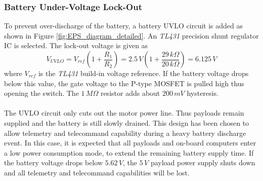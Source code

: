 \subsubsection{Battery Under-Voltage Lock-Out}
To prevent over-discharge of the battery, a battery \ac{UVLO} circuit is added as shown in Figure \ref{fig:EPS_diagram_detailed}. An \textit{TL431} precision shunt regulator \ac{IC} is selected. The lock-out voltage is given as
%
\begin{equation}
V_{UVLO}=V_{ref}(1+\dfrac{R_1}{R_2})=2.5\,V(1+\dfrac{29\,k \Omega}{20\,k \Omega})=6.125\,V
\end{equation}
%
where $V_{ref}$ is the \textit{TL431} build-in voltage reference. If the battery voltage drops below this value, the gate voltage to the P-type MOSFET is pulled high thus opening the switch. The $1\,M \Omega$ resistor adds about $200\,mV$ hysteresis. 
\\
\\
The \ac{UVLO} circuit only cuts out the motor power line. Thus payloads remain supplied and the battery is still slowly drained. This design has been chosen to allow  telemetry and telecommand capability during a heavy battery discharge event. In this case, it is expected that all payloads and on-board computers enter a low power consumption mode, to extend the remaining battery supply time. If the battery voltage drops below $5.62\,V$, the $5\,V$ payload power supply shuts down and all telemetry and telecommand capabilities will be lost.

\pagebreak

